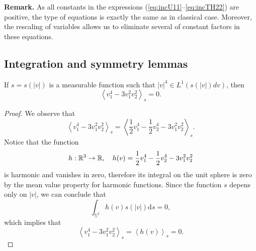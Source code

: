 \textbf{Remark.} As all constants in the expressions (\ref{eq:incU11}--\ref{eq:incTH22}) are positive, the type of equations is exactly the same as in classical case.
 Moreover, the rescaling of variables  allows us to eliminate several of constant factors in these equations.

\begin{subappendices}
\renewcommand{\thesection}{\Alph{section}}
\renewcommand{\thetheorem}{\thesection.\Roman{theorem}}
\setcounter{theorem}{0}
\renewcommand{\thelemma}{\thesection.\arabic{lemma}}
\setcounter{lemma}{0}
\renewcommand{\theproposition}{\thesection.\arabic{proposition}}
\setcounter{proposition}{0}
\section{Integration and symmetry lemmas} %
\label{sec:integration_and_symmetry_lemmas}


\begin{proposition}  If $s=s(|v|)$ is a measurable function such that 
$|v|^4\in L^1(s(|v|)dv)$, then
\[\left\langle v_1^4-3v_1^2v_2^2\right\rangle_{s}=0.\]
\end{proposition}
\begin{proof}
We observe that \[\left\langle v_1^4-3v_1^2v_2^2\right\rangle_{s}=\left\langle \frac 12 v_1^4-\frac 12 v_2^4-3v_1^2v_2^2\right\rangle_{s}.\]
Notice that the function
\[h:{\mathbb {R}^3}\to {\mathbb {R}},\quad h(v) = \frac 12 v_1^4-\frac 12 v_2^4-3v_1^2v_2^2\]
is harmonic and vanishes in zero, therefore its integral on the unit sphere is zero by the mean value property for harmonic functions. Since the function $s$ depens only on $|v|$, we can conclude that
\[\int_{\mathbb S^2} h(v)s(|v|)\mathrm ds=0,\]
which implies that
\[\left\langle v_1^4-3v_1^2v_2^2\right\rangle_{s}=\left\langle h(v)\right\rangle_{s}=0.\]
\end{proof}


\end{subappendices}
